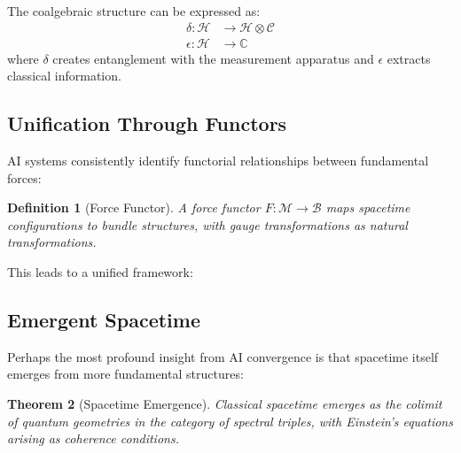 \documentclass[11pt,a4paper]{article}
\newtheorem{theorem}{Theorem}[section]
\newtheorem{definition}[theorem]{Definition}
\begin{document}
The coalgebraic structure can be expressed as:
\begin{align}
\delta: \mathcal{H} &\rightarrow \mathcal{H} \otimes \mathcal{C} \\
\epsilon: \mathcal{H} &\rightarrow \mathbb{C}
\end{align}
where $\delta$ creates entanglement with the measurement apparatus and $\epsilon$ extracts classical information.

\subsection{Unification Through Functors}

AI systems consistently identify functorial relationships between fundamental forces:

\begin{definition}[Force Functor]
A force functor $F: \mathcal{M} \rightarrow \mathcal{B}$ maps spacetime configurations to bundle structures, with gauge transformations as natural transformations.
\end{definition}

This leads to a unified framework:

\begin{center}
\end{center}

\subsection{Emergent Spacetime}

Perhaps the most profound insight from AI convergence is that spacetime itself emerges from more fundamental structures:

\begin{theorem}[Spacetime Emergence]
Classical spacetime emerges as the colimit of quantum geometries in the category of spectral triples, with Einstein's equations arising as coherence conditions.
\end{theorem}
\end{document}

